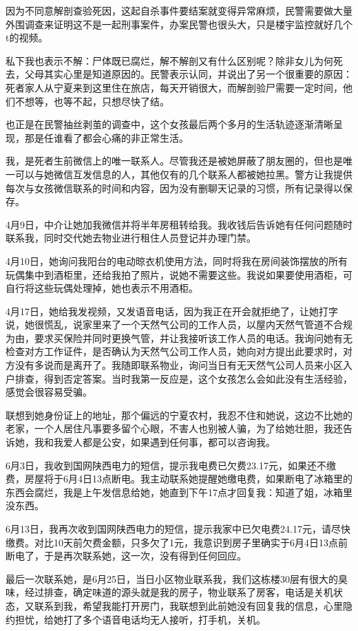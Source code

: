 因为不同意解剖查验死因，这起自杀事件要结案就变得异常麻烦，民警需要做大量外围调查来证明这不是一起刑事案件，办案民警也很头大，只是楼宇监控就好几个t的视频。

私下我也表示不解：尸体既已腐烂，解不解剖又有什么区别呢？除非女儿为何死去，父母其实心里是知道原因的。民警表示认同，并说出了另一个很重要的原因：死者家人从宁夏来到这里住在旅店，每天开销很大，而解剖验尸需要一定时间，他们不想等，也等不起，只想尽快了结。

也正是在民警抽丝剥茧的调查中，这个女孩最后两个多月的生活轨迹逐渐清晰呈现，那是任谁看了都会心痛的非正常生活。

我，是死者生前微信上的唯一联系人。尽管我还是被她屏蔽了朋友圈的，但也是唯一可以与她微信互发信息的人，其他仅有的几个联系人都被她拉黑。警方让我提供每次与女孩微信联系的时间和内容，因为没有删聊天记录的习惯，所有记录得以保存。

4月9日，中介让她加我微信并将半年房租转给我。我收钱后告诉她有任何问题随时联系我，同时交代她去物业进行租住人员登记并办理门禁。

4月10日，她询问我阳台的电动晾衣机使用方法，同时将我在房间装饰摆放的所有玩偶集中到酒柜里，还给我拍了照片，说她不需要这些。我说如果要使用酒柜，可自行将这些玩偶处理掉，她也表示不用酒柜。

4月17日，她给我发视频，又发语音电话，因为我正在开会就拒绝了，让她打字说，她很慌乱，说家里来了一个天然气公司的工作人员，以屋内天然气管道不合规为由，要求买保险并同时更换气管，并让我接听该工作人员的电话。我询问她有无检查对方工作证件，是否确认为天然气公司工作人员，她向对方提出此要求时，对方没有多说而是离开了。我随即联系物业，询问当日有无天然气公司人员来小区入户排查，得到否定答案。当时我第一反应是，这个女孩怎么会如此没有生活经验，感觉会很容易受骗。

联想到她身份证上的地址，那个偏远的宁夏农村，我忍不住和她说，这边不比她的老家，一个人居住凡事要多留个心眼，不害人也别被人骗，为了给她壮胆，我还告诉她，我和我爱人都是公安，如果遇到任何事，都可以咨询我。

6月3日，我收到国网陕西电力的短信，提示我电费已欠费23.17元，如果还不缴费，房屋将于6月4日13点断电。我主动联系她提醒她缴电费，如果断电了冰箱里的东西会腐烂，我是上午发信息给她，她直到下午17点才回复我：知道了姐，冰箱里没东西。

6月13日，我再次收到国网陕西电力的短信，提示我家中已欠电费24.17元，请尽快缴费。对比10天前欠费金额，只多欠了1元，我意识到房子里确实于6月4日13点前断电了，于是再次联系她，这一次，没有得到任何回应。

最后一次联系她，是6月25日，当日小区物业联系我，我们这栋楼30层有很大的臭味，经过排查，确定味道的源头就是我的房子，物业联系了房客，电话是关机状态，又联系到我，希望我能打开房门，我联想到此前她没有回复我的信息，心里隐约担忧，给她打了多个语音电话均无人接听，打手机，关机。

